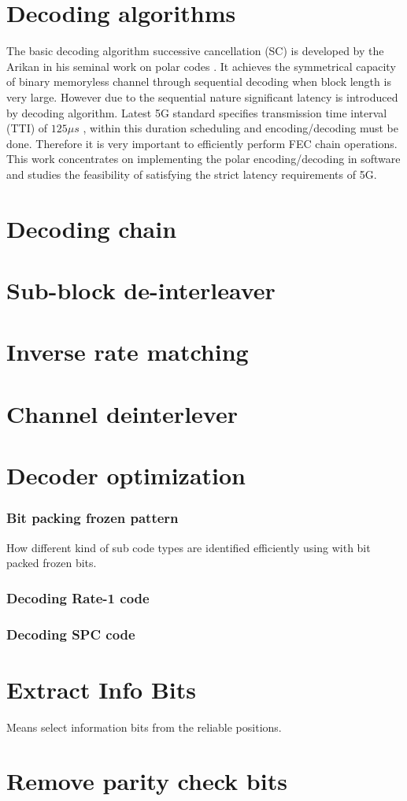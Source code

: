 \section{Decoding algorithms}
The basic decoding algorithm successive cancellation (SC) is developed by the Arikan in his seminal work on polar codes \cite{Arikan}. It achieves the symmetrical capacity of binary memoryless channel through sequential decoding when block length is very large. However due to the sequential nature significant latency is introduced by decoding algorithm. Latest 5G standard specifies transmission time interval (TTI) of $125 \mu s$ , within this duration scheduling and encoding/decoding must be done. Therefore it is very important to efficiently perform FEC chain operations. This work concentrates on implementing the polar encoding/decoding in software and studies the feasibility of satisfying the strict latency requirements of 5G.

\section{Decoding chain}

\section{Sub-block de-interleaver}

\section{Inverse rate matching}

\section{Channel deinterlever}

\section{Decoder optimization}

\subsubsection{Bit packing frozen pattern}
How different kind of sub code types are identified efficiently using with bit packed frozen bits.

\subsubsection{Decoding Rate-1 code}

\subsubsection{Decoding SPC code}

\section{Extract Info Bits}
Means select information bits from the reliable positions.

\section{Remove parity check bits}


